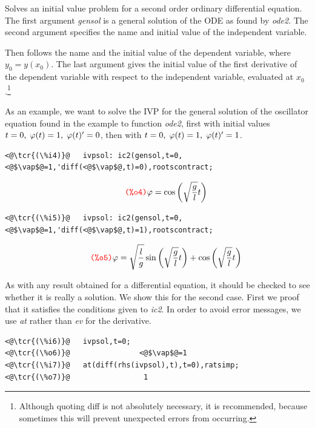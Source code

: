 \documentclass[../Maxima_Workbook.tex]{subfiles}
\begin{document}
\lz Solves an initial value problem for a second order ordinary differential equation. The first argument \emph{gensol} is a general solution of the ODE as found by \emph{ode2}. The second argument specifies the name and initial value of the independent variable.\addtocounter{footnote}{-1}\footnotemark {} Then follows the name and the initial value of the dependent variable, where $ y_0=y(x_0) $. The last argument gives the initial value of the first derivative of the dependent variable with respect to the independent variable, evaluated at $ x_0 $.\footnote{Although quoting diff is not absolutely necessary, it is recommended, because sometimes this will prevent unexpected errors from occurring.}

\lz As an example, we want to solve the IVP for the general solution of the oscillator equation found in the example to function \emph{ode2}, first with initial values $ t=0, \; \varphi(t)=1, \; \varphi(t)'=0 $, then with $ t=0, \; \varphi(t)=1, \; \varphi(t)'=1 $.

\lz \begin{small}
\color{blue} \leqn
\begin{lstlisting}
<@\tcr{(\%i4)}@   ivpsol: ic2(gensol,t=0,<@$\vap$@=1,'diff(<@$\vap$@,t)=0),rootscontract;
\end{lstlisting}
\vspace{-4mm} \[\tag*{\tcr{\ttfamily (\%o4)}} \vap =\cos{\left( \sqrt{\frac{g}{l}} t\right) } \]
\vspace{-4mm} \begin{lstlisting}
<@\tcr{(\%i5)}@   ivpsol: ic2(gensol,t=0,<@$\vap$@=1,'diff(<@$\vap$@,t)=1),rootscontract;
\end{lstlisting}
\vspace{-4mm} \[\tag*{\tcr{\ttfamily (\%o5)}} \vap =\sqrt{\frac{l}{g}} \sin{\left( \sqrt{\frac{g}{l}} t\right) }+\cos{\left( \sqrt{\frac{g}{l}} t\right) } \]
\color{black} \reqn
\end{small} \vspace{-4mm}

\lz As with any result obtained for a differential equation, it should be checked to see whether it is really a solution. We show this for the second case. First we proof that it satisfies the conditions given to \emph{ic2}. In order to avoid error messages, we use \emph{at} rather than \emph{ev} for the derivative.

\lz \begin{small}
\color{blue}
\begin{lstlisting}
<@\tcr{(\%i6)}@   ivpsol,t=0;
<@\tcr{(\%o6)}@			       <@$\vap$@=1
<@\tcr{(\%i7)}@   at(diff(rhs(ivpsol),t),t=0),ratsimp;
<@\tcr{(\%o7)}@			        1
\end{lstlisting}
\color{black}
\end{small} \vspace{-1mm}
\end{document}
